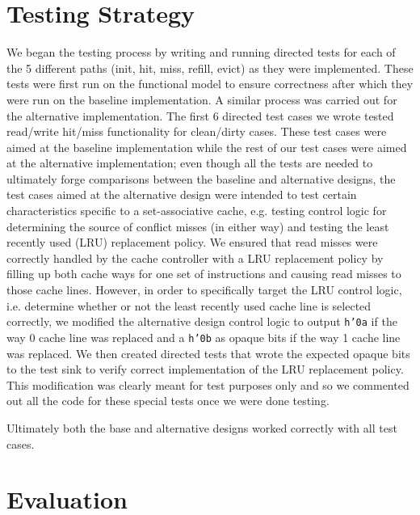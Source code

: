 \documentclass[10pt]{article}
\begin{document}
\section{Testing Strategy}

We began the testing process by writing and running directed tests for each of the 5 different paths (init, hit, miss, refill, evict) as they were implemented. These tests were first run on the functional model to ensure correctness after which they were run on the baseline implementation. A similar process was carried out for the alternative implementation. The first 6 directed test cases we wrote tested read/write hit/miss functionality for clean/dirty cases. These test cases were aimed at the baseline implementation while the rest of our test cases were aimed at the alternative implementation; even though all the tests are needed to ultimately forge comparisons between the baseline and alternative designs, the test cases aimed at the alternative design were intended to test certain characteristics specific to a set-associative cache, e.g. testing control logic for determining the source of conflict misses (in either way) and testing the least recently used (LRU) replacement policy. We ensured that read misses were correctly handled by the cache controller with a LRU replacement policy by filling up both cache ways for one set of instructions and causing read misses to those cache lines. However, in order to specifically target the LRU control logic, i.e. determine whether or not the least recently used cache line is selected correctly, we modified the alternative design control logic to output \texttt{h'0a} if the way 0 cache line was replaced and a \texttt{h'0b} as opaque bits if the way 1 cache line was replaced. We then created directed tests that wrote the expected opaque bits to the test sink to verify correct implementation of the LRU replacement policy. This modification was clearly meant for test purposes only and so we commented out all the code for these special tests once we were done testing. 





Ultimately both the base and alternative designs worked correctly with all test cases.  \\


\section{Evaluation}
\end{document}
